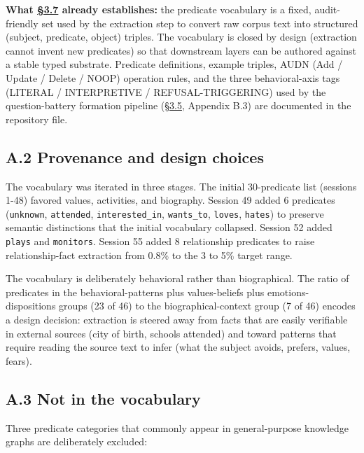 \textbf{What \hyperref[pipeline-for-the-behavioral-specification]{§3.7} already establishes:} the predicate vocabulary is a
fixed, audit-friendly set used by the extraction step to convert raw
corpus text into structured (subject, predicate, object) triples. The
vocabulary is closed by design (extraction cannot invent new predicates)
so that downstream layers can be authored against a stable typed
substrate. Predicate definitions, example triples, AUDN (Add / Update /
Delete / NOOP) operation rules, and the three behavioral-axis tags
(LITERAL / INTERPRETIVE / REFUSAL-TRIGGERING) used by the
question-battery formation pipeline (\hyperref[question-battery-formation]{§3.5}, Appendix B.3) are documented
in the repository file.

\hypertarget{a.2-provenance-and-design-choices}{%
\subsection{A.2 Provenance and design
choices}\label{a.2-provenance-and-design-choices}}

The vocabulary was iterated in three stages. The initial 30-predicate
list (sessions 1-48) favored values, activities, and biography. Session
49 added 6 predicates (\texttt{unknown}, \texttt{attended},
\texttt{interested\_in}, \texttt{wants\_to}, \texttt{loves},
\texttt{hates}) to preserve semantic distinctions that the initial
vocabulary collapsed. Session 52 added \texttt{plays} and
\texttt{monitors}. Session 55 added 8 relationship predicates to raise
relationship-fact extraction from 0.8\% to the 3 to 5\% target range.

The vocabulary is deliberately behavioral rather than biographical. The
ratio of predicates in the behavioral-patterns plus values-beliefs plus
emotions-dispositions groups (23 of 46) to the biographical-context
group (7 of 46) encodes a design decision: extraction is steered away
from facts that are easily verifiable in external sources (city of
birth, schools attended) and toward patterns that require reading the
source text to infer (what the subject avoids, prefers, values, fears).

\hypertarget{a.3-not-in-the-vocabulary}{%
\subsection{A.3 Not in the vocabulary}\label{a.3-not-in-the-vocabulary}}

Three predicate categories that commonly appear in general-purpose
knowledge graphs are deliberately excluded:

